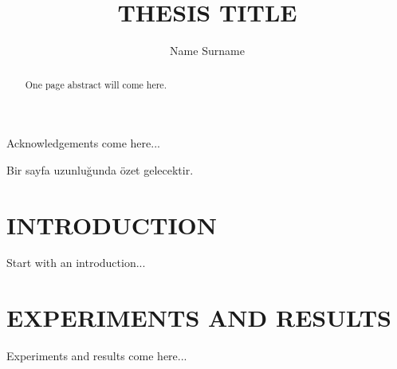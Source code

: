 \documentclass[a4paper,onesided,12pt]{report}
\title{THESIS TITLE}
\author{Name Surname}
\begin{document}
\makemstitle %
\makeapprovalpage
\begin{acknowledgements}
Acknowledgements come here...
\end{acknowledgements}
\begin{abstract}
One page abstract will come here.  
\end{abstract}
\begin{ozet}
Bir sayfa uzunluğunda özet gelecektir.
\end{ozet}
\tableofcontents
\listoffigures
\listoftables
\begin{symbols}
%

\sym{}{}
\sym{ }{}

\end{symbols}

\begin{abbreviations}
\end{abbreviations}


\chapter{INTRODUCTION}
\label{chapter:introduction}
Start with an introduction...

%
\chapter{EXPERIMENTS AND RESULTS}
\label{chapter:experiments-and-results}

Experiments and results come here... 
\end{document}
